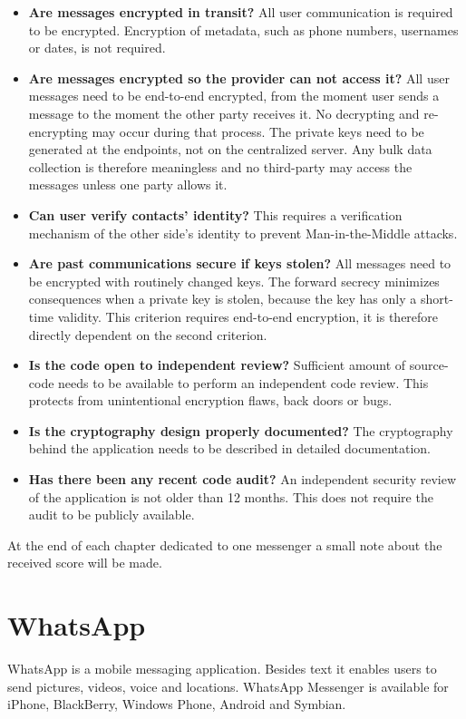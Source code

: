 \documentclass[thesis=M,english]{FITthesis}[2012/10/20]
\begin{document}
\begin{itemize}
	\item \textbf{Are messages encrypted in transit?} All user communication is required to be encrypted. Encryption of metadata, such as phone numbers, usernames or dates, is not required.
	\item \textbf{Are messages encrypted so the provider can not access it?} All user messages need to be end-to-end encrypted, from the moment user sends a message to the moment the other party receives it. No decrypting  and re-encrypting may occur during that process. The private keys need to be generated at the endpoints, not on the centralized server. Any bulk data collection is therefore meaningless and no third-party may access the messages unless one party allows it.
	\item \textbf{Can user verify contacts' identity?} This requires a verification mechanism of the other side's identity to prevent Man-in-the-Middle attacks. 
	\item \textbf{Are past communications secure if keys stolen?} All messages need to be encrypted with routinely changed keys. The forward secrecy minimizes consequences when a private key is stolen, because the key has only a short-time validity. This criterion requires end-to-end encryption, it is therefore directly dependent on the second criterion.
	\item \textbf{Is the code open to independent review?} Sufficient amount of source-code needs to be available to perform an independent code review. This protects from unintentional encryption flaws, back doors or bugs.
	\item \textbf{Is the cryptography design properly documented?} The cryptography behind the application needs to be described in detailed documentation.
	\item \textbf{Has there been any recent code audit?} An independent security review of the application is not older than 12 months. This does not require the audit to be publicly available.
\end{itemize}

At the end of each chapter dedicated to one messenger a small note about the received score will be made.

\section{WhatsApp}\label{whatsapp}

WhatsApp is a mobile messaging application. Besides text it enables users to send pictures, videos, voice and locations. WhatsApp Messenger is available for iPhone, BlackBerry, Windows Phone, Android and Symbian\cite{whatsapphomepage}.
\end{document}
